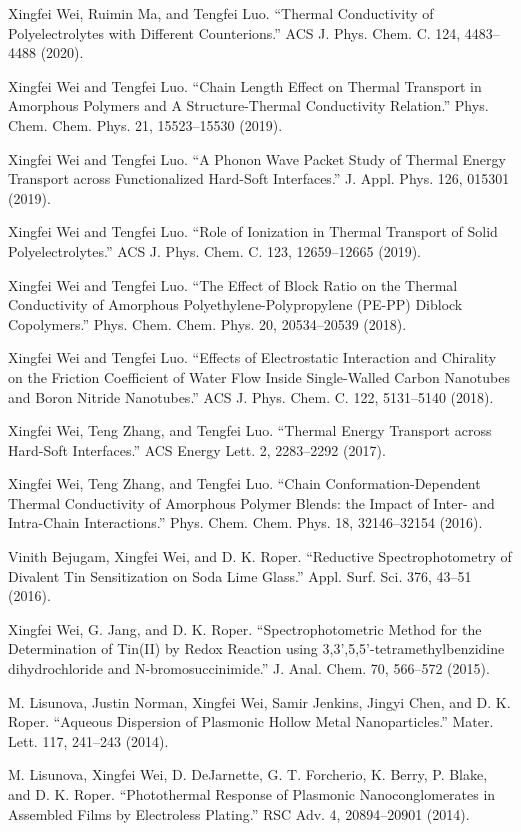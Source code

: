   \item {}
  \item {}
  \item {}
  \item {}
  \item {Xingfei Wei, Ruimin Ma, and Tengfei Luo. 
``Thermal Conductivity of Polyelectrolytes with Different Counterions.'' 
ACS J. Phys. Chem. C. 124, 4483--4488 (2020).}
  \item {Xingfei Wei and Tengfei Luo. 
``Chain Length Effect on Thermal Transport in Amorphous Polymers and A Structure-Thermal Conductivity Relation.''
Phys. Chem. Chem. Phys. 21, 15523--15530 (2019).}
  \item {Xingfei Wei and Tengfei Luo. 
``A Phonon Wave Packet Study of Thermal Energy Transport across Functionalized Hard-Soft Interfaces.'' 
J. Appl. Phys. 126, 015301 (2019).}
  \item {Xingfei Wei and Tengfei Luo. 
``Role of Ionization in Thermal Transport of Solid Polyelectrolytes.'' 
ACS J. Phys. Chem. C. 123, 12659--12665 (2019).}
  \item {Xingfei Wei and Tengfei Luo. 
``The Effect of Block Ratio on the Thermal Conductivity of Amorphous Polyethylene-Polypropylene (PE-PP) Diblock Copolymers.''
Phys. Chem. Chem. Phys. 20, 20534--20539 (2018).}
  \item {Xingfei Wei and Tengfei Luo. 
``Effects of Electrostatic Interaction and Chirality on the Friction Coefficient of Water Flow Inside Single-Walled Carbon Nanotubes and Boron Nitride Nanotubes.''
ACS J. Phys. Chem. C. 122, 5131--5140 (2018).}
  \item {Xingfei Wei, Teng Zhang, and Tengfei Luo. 
``Thermal Energy Transport across Hard-Soft Interfaces.''
ACS Energy Lett. 2, 2283--2292 (2017).}
  \item {}
  \item {Xingfei Wei, Teng Zhang, and Tengfei Luo. 
``Chain Conformation-Dependent Thermal Conductivity of Amorphous Polymer Blends: the Impact of Inter- and Intra-Chain Interactions.''
Phys. Chem. Chem. Phys. 18, 32146--32154 (2016).}
  \item {Vinith Bejugam, Xingfei Wei, and D. K. Roper. 
``Reductive Spectrophotometry of Divalent Tin Sensitization on Soda Lime Glass.''
Appl. Surf. Sci. 376, 43--51 (2016).}
  \item {Xingfei Wei, G. Jang, and D. K. Roper. 
``Spectrophotometric Method for the Determination of Tin(II) by Redox Reaction using 3,3',5,5'-tetramethylbenzidine dihydrochloride and N-bromosuccinimide.'' 
J. Anal. Chem. 70, 566--572 (2015).}
  \item {}
  \item {M. Lisunova, Justin Norman, Xingfei Wei, Samir Jenkins, Jingyi Chen, and D. K. Roper. 
``Aqueous Dispersion of Plasmonic Hollow Metal Nanoparticles.''
Mater. Lett. 117, 241--243 (2014).}
  \item {M. Lisunova, Xingfei Wei, D. DeJarnette, G. T. Forcherio, K. Berry, P. Blake, and D. K. Roper. 
``Photothermal Response of Plasmonic Nanoconglomerates in Assembled Films by Electroless Plating.'' 
RSC Adv. 4, 20894--20901 (2014).}



